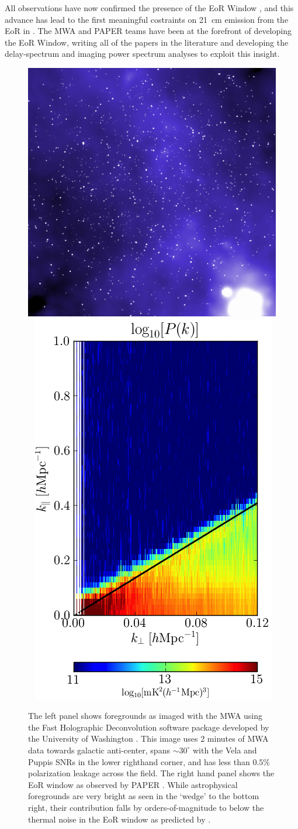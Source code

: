 \documentclass[preprint]{aastex}
\begin{document}
All observations have now confirmed the presence of the EoR Window \citep{pober_et_al2013,dillon_et_al2013b}, and this advance has lead to the first meaningful costraints on 21~cm emission from the EoR in \citet{parsons_et_al2013}. The MWA and PAPER teams have been at the forefront of developing the EoR Window, writing all of the papers in the literature and developing the delay-spectrum and imaging power spectrum analyses to exploit this insight. 




\begin{figure}[t]
\centering
\includegraphics[width=3.6 in]{plots/MWApretty.png}
~ %
\includegraphics[width=2.4 in]{plots/wedge_tall.png}
\caption{\small
The left panel shows foregrounds as imaged with the MWA using the Fast Holographic Deconvolution software package developed by the University of Washington \citep{sullivan_et_al2012}. This image uses 2 minutes of MWA data towards galactic anti-center, spans $\sim$$30^{\circ}$ with the Vela and Puppis SNRs in the lower righthand corner, and has less than $0.5\%$ polarization leakage across the field. The right hand panel shows the EoR window as observed by PAPER \citep{pober_et_al2013}. While astrophysical foregrounds are very bright as seen in the `wedge' to the bottom right, their contribution falls by orders-of-magnitude to below the thermal noise in the EoR window as predicted by \citet{morales_et_al2012,parsons_et_al2012b,vedantham_2012,hazelton_et_al2013}.
$$}
\end{figure}
\end{document}
